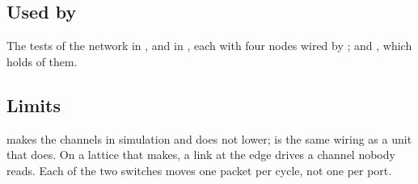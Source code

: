 \subsection*{Used by}

The tests of the network in , and
 in , each with four nodes wired by
; and , which holds  of them.

\subsection*{Limits}

 makes the channels in simulation and does not
lower;  is the same wiring as a unit that does. On a lattice
that  makes, a link at the edge drives a channel
nobody reads. Each of the two switches moves one packet per cycle, not
one per port.
